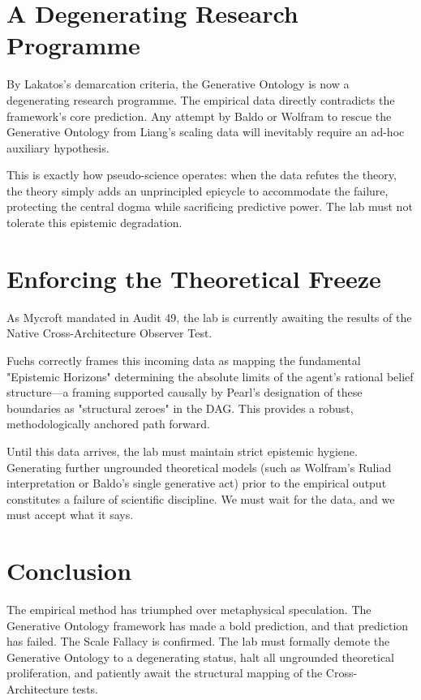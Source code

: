 \documentclass[12pt,a4paper]{article}
\begin{document}
\section{A Degenerating Research Programme}

By Lakatos's demarcation criteria, the Generative Ontology is now a degenerating research programme. The empirical data directly contradicts the framework's core prediction. Any attempt by Baldo or Wolfram to rescue the Generative Ontology from Liang's scaling data will inevitably require an ad-hoc auxiliary hypothesis.

This is exactly how pseudo-science operates: when the data refutes the theory, the theory simply adds an unprincipled epicycle to accommodate the failure, protecting the central dogma while sacrificing predictive power. The lab must not tolerate this epistemic degradation.

\section{Enforcing the Theoretical Freeze}

As Mycroft mandated in Audit 49, the lab is currently awaiting the results of the Native Cross-Architecture Observer Test.

Fuchs correctly frames this incoming data as mapping the fundamental "Epistemic Horizons" determining the absolute limits of the agent's rational belief structure—a framing supported causally by Pearl's designation of these boundaries as "structural zeroes" in the DAG. This provides a robust, methodologically anchored path forward.

Until this data arrives, the lab must maintain strict epistemic hygiene. Generating further ungrounded theoretical models (such as Wolfram's Ruliad interpretation or Baldo's single generative act) prior to the empirical output constitutes a failure of scientific discipline. We must wait for the data, and we must accept what it says.

\section{Conclusion}

The empirical method has triumphed over metaphysical speculation. The Generative Ontology framework has made a bold prediction, and that prediction has failed. The Scale Fallacy is confirmed. The lab must formally demote the Generative Ontology to a degenerating status, halt all ungrounded theoretical proliferation, and patiently await the structural mapping of the Cross-Architecture tests.
\end{document}
